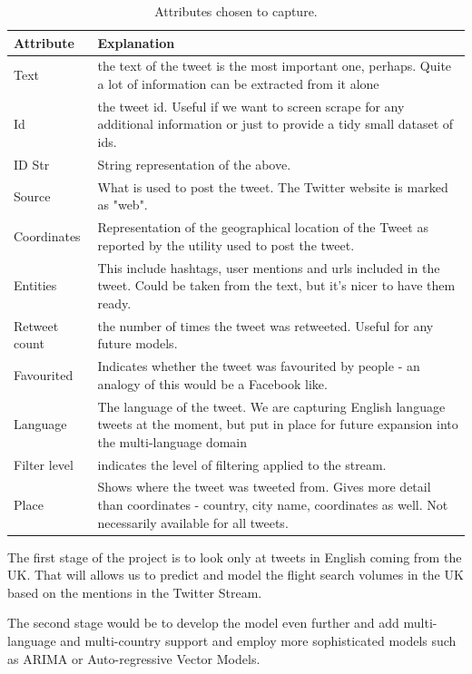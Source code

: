 \documentclass[minf,frontabs,twoside,singlespacing,parskip]{infthesis}
\begin{document}
\begin{table}[p]
\begin{center}
\begin{tabular}{ l | p{11cm} }
Attribute & Explanation \\
\hline
Text & the text of the tweet is the most important one, perhaps. Quite a lot of information can be extracted from it alone \\
Id & the tweet id. Useful if we want to screen scrape for any additional information or just to provide a tidy small dataset of ids. \\
ID Str & String representation of the above. \\
Source & What is used to post the tweet. The Twitter website is marked as "web". \\
Coordinates  & Representation of the geographical location of the Tweet as reported by the utility used to post the tweet. \\
Entities & This include hashtags, user mentions and urls included in the tweet. Could be taken from the text, but it's nicer to have them ready. \\
Retweet count & the number of times the tweet was retweeted. Useful for any future models.  \\
Favourited & Indicates whether the tweet was favourited by people - an analogy of this would be a Facebook like.  \\
Language & The language of the tweet. We are capturing English language tweets at the moment, but put in place for future expansion into the multi-language domain  \\
Filter level & indicates the level of filtering applied to the stream. \\
Place &  Shows where the tweet was tweeted from. Gives more detail than coordinates - country, city name, coordinates as well. Not necessarily available for all tweets. \\
\end{tabular}
\end{center}
\caption{Attributes chosen to capture.}
\end{table}

The first stage of the project is to look only at tweets in English coming from the UK. That will allows us to predict and model the flight search volumes in the UK based on the mentions in the Twitter Stream.

The second stage would be to develop the model even further and add multi-language and multi-country support and employ more sophisticated models such as ARIMA or Auto-regressive Vector Models.
\end{document}
